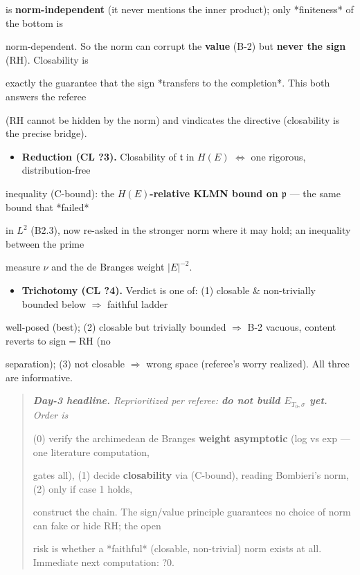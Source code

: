 \documentclass[10pt]{article}
\begin{document}
  is \textbf{norm-independent} (it never mentions the inner product); only *finiteness* of the bottom is\par
  norm-dependent. So the norm can corrupt the \textbf{value} (B-2) but \textbf{never the sign} (RH). Closability is\par
  exactly the guarantee that the sign *transfers to the completion*. This both answers the referee\par
  (RH cannot be hidden by the norm) and vindicates the directive (closability is the precise bridge).\par
\begin{itemize}
\item \textbf{Reduction (CL ?3).} Closability of $\mathfrak t$ in $H(E)$ $\iff$ one rigorous, distribution-free
\end{itemize}
  inequality (C-bound): the \textbf{$H(E)$-relative KLMN bound on $\mathfrak p$} --- the same bound that *failed*\par
  in $L^2$ (B2.3), now re-asked in the stronger norm where it may hold; an inequality between the prime\par
  measure $\nu$ and the de Branges weight $|E|^{-2}$.\par
\begin{itemize}
\item \textbf{Trichotomy (CL ?4).} Verdict is one of: (1) closable \& non-trivially bounded below \ensuremath{\Rightarrow} faithful ladder
\end{itemize}
  well-posed (best); (2) closable but trivially bounded \ensuremath{\Rightarrow} B-2 vacuous, content reverts to sign$=$RH (no\par
  separation); (3) not closable \ensuremath{\Rightarrow} wrong space (referee's worry realized). All three are informative.\par

\begin{quote}\itshape
\textbf{Day-3 headline.} Reprioritized per referee: \textbf{do not build $E_{T_0,\sigma}$ yet.} Order is\par
(0) verify the archimedean de Branges \textbf{weight asymptotic} (log vs exp --- one literature computation,\par
gates all), (1) decide \textbf{closability} via (C-bound), reading Bombieri's norm, (2) only if case 1 holds,\par
construct the chain. The sign/value principle guarantees no choice of norm can fake or hide RH; the open\par
risk is whether a *faithful* (closable, non-trivial) norm exists at all. Immediate next computation: ?0.\par
\end{quote}
\end{document}
